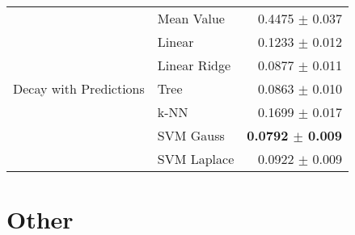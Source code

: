 \documentclass[10pt]{article}
\begin{document}
\begin{table}[H]
\begin{tabular}{llr}
    \hline
    \multirow{7}{*}{Decay with Predictions} & Mean Value   & 0.4475 $\pm$ 0.037 \\
                               & Linear       & 0.1233 $\pm$ 0.012 \\
                               & Linear Ridge & 0.0877 $\pm$ 0.011 \\
                               & Tree         & 0.0863 $\pm$ 0.010 \\
                               & k-NN         & 0.1699 $\pm$ 0.017 \\
                               & SVM Gauss    & \textbf{0.0792 $\pm$ 0.009} \\
                               & SVM Laplace  & 0.0922 $\pm$ 0.009 \\
    \hline\hline
  \end{tabular}
  \label{tab:lumoresults}
\end{table}






\section{Other}
\end{document}
